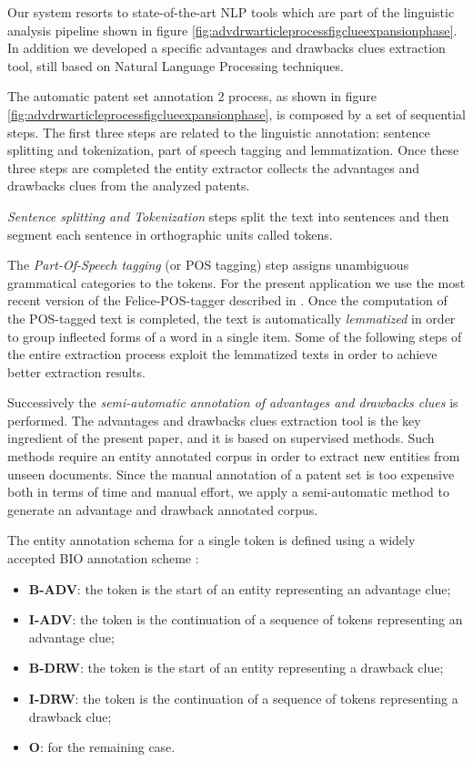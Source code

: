 \documentclass[]{book}
\providecommand{\tightlist}{%
  \setlength{\itemsep}{0pt}\setlength{\parskip}{0pt}}
\theoremstyle{definition}
\theoremstyle{definition}
\theoremstyle{definition}
\theoremstyle{remark}
\begin{document}
Our system resorts to state-of-the-art NLP tools which are part of the
linguistic analysis pipeline shown in figure
\ref{fig:advdrwarticleprocessfigclueexpansionphase}. In addition we
developed a specific advantages and drawbacks clues extraction tool,
still based on Natural Language Processing techniques.

The automatic patent set annotation 2 process, as shown in figure
\ref{fig:advdrwarticleprocessfigclueexpansionphase}, is composed by a
set of sequential steps. The first three steps are related to the
linguistic annotation: sentence splitting and tokenization, part of
speech tagging and lemmatization. Once these three steps are completed
the entity extractor collects the advantages and drawbacks clues from
the analyzed patents.

\emph{Sentence splitting and Tokenization} steps split the text into
sentences and then segment each sentence in orthographic units called
tokens.

The \emph{Part-Of-Speech tagging} (or POS tagging) step assigns
unambiguous grammatical categories to the tokens. For the present
application we use the most recent version of the Felice-POS-tagger
described in \citep{dell2009ensemble}. Once the computation of the
POS-tagged text is completed, the text is automatically
\emph{lemmatized} in order to group inflected forms of a word in a
single item. Some of the following steps of the entire extraction
process exploit the lemmatized texts in order to achieve better
extraction results.

Successively the \emph{semi-automatic annotation of advantages and
drawbacks clues} is performed. The advantages and drawbacks clues
extraction tool is the key ingredient of the present paper, and it is
based on supervised methods. Such methods require an entity annotated
corpus in order to extract new entities from unseen documents. Since the
manual annotation of a patent set is too expensive both in terms of time
and manual effort, we apply a semi-automatic method to generate an
advantage and drawback annotated corpus.

The entity annotation schema for a single token is defined using a
widely accepted BIO annotation scheme \citep{ramshaw}:

\begin{itemize}
\tightlist
\item
  \textbf{B-ADV}: the token is the start of an entity representing an
  advantage clue;
\item
  \textbf{I-ADV}: the token is the continuation of a sequence of tokens
  representing an advantage clue;
\item
  \textbf{B-DRW}: the token is the start of an entity representing a
  drawback clue;
\item
  \textbf{I-DRW}: the token is the continuation of a sequence of tokens
  representing a drawback clue;
\item
  \textbf{O}: for the remaining case.
\end{itemize}
\end{document}
